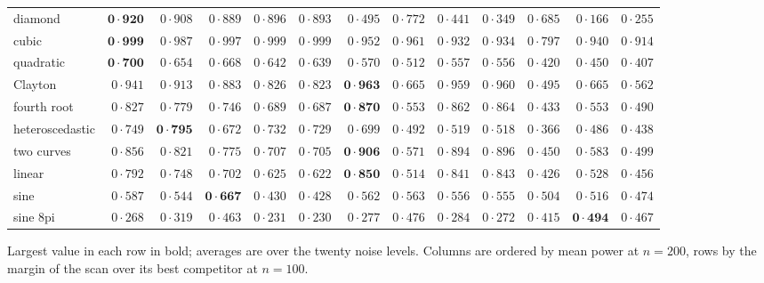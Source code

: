 \begin{table}
{\begin{tabular}{lrrrrrrrrrrrr}
diamond & $\mathbf{0{\cdot}920}$ & $0{\cdot}908$ & $0{\cdot}889$ & $0{\cdot}896$ & $0{\cdot}893$ & $0{\cdot}495$ & $0{\cdot}772$ & $0{\cdot}441$ & $0{\cdot}349$ & $0{\cdot}685$ & $0{\cdot}166$ & $0{\cdot}255$ \\
cubic & $\mathbf{0{\cdot}999}$ & $0{\cdot}987$ & $0{\cdot}997$ & $0{\cdot}999$ & $0{\cdot}999$ & $0{\cdot}952$ & $0{\cdot}961$ & $0{\cdot}932$ & $0{\cdot}934$ & $0{\cdot}797$ & $0{\cdot}940$ & $0{\cdot}914$ \\
quadratic & $\mathbf{0{\cdot}700}$ & $0{\cdot}654$ & $0{\cdot}668$ & $0{\cdot}642$ & $0{\cdot}639$ & $0{\cdot}570$ & $0{\cdot}512$ & $0{\cdot}557$ & $0{\cdot}556$ & $0{\cdot}420$ & $0{\cdot}450$ & $0{\cdot}407$ \\
Clayton & $0{\cdot}941$ & $0{\cdot}913$ & $0{\cdot}883$ & $0{\cdot}826$ & $0{\cdot}823$ & $\mathbf{0{\cdot}963}$ & $0{\cdot}665$ & $0{\cdot}959$ & $0{\cdot}960$ & $0{\cdot}495$ & $0{\cdot}665$ & $0{\cdot}562$ \\
fourth root & $0{\cdot}827$ & $0{\cdot}779$ & $0{\cdot}746$ & $0{\cdot}689$ & $0{\cdot}687$ & $\mathbf{0{\cdot}870}$ & $0{\cdot}553$ & $0{\cdot}862$ & $0{\cdot}864$ & $0{\cdot}433$ & $0{\cdot}553$ & $0{\cdot}490$ \\
heteroscedastic & $0{\cdot}749$ & $\mathbf{0{\cdot}795}$ & $0{\cdot}672$ & $0{\cdot}732$ & $0{\cdot}729$ & $0{\cdot}699$ & $0{\cdot}492$ & $0{\cdot}519$ & $0{\cdot}518$ & $0{\cdot}366$ & $0{\cdot}486$ & $0{\cdot}438$ \\
two curves & $0{\cdot}856$ & $0{\cdot}821$ & $0{\cdot}775$ & $0{\cdot}707$ & $0{\cdot}705$ & $\mathbf{0{\cdot}906}$ & $0{\cdot}571$ & $0{\cdot}894$ & $0{\cdot}896$ & $0{\cdot}450$ & $0{\cdot}583$ & $0{\cdot}499$ \\
linear & $0{\cdot}792$ & $0{\cdot}748$ & $0{\cdot}702$ & $0{\cdot}625$ & $0{\cdot}622$ & $\mathbf{0{\cdot}850}$ & $0{\cdot}514$ & $0{\cdot}841$ & $0{\cdot}843$ & $0{\cdot}426$ & $0{\cdot}528$ & $0{\cdot}456$ \\
sine & $0{\cdot}587$ & $0{\cdot}544$ & $\mathbf{0{\cdot}667}$ & $0{\cdot}430$ & $0{\cdot}428$ & $0{\cdot}562$ & $0{\cdot}563$ & $0{\cdot}556$ & $0{\cdot}555$ & $0{\cdot}504$ & $0{\cdot}516$ & $0{\cdot}474$ \\
sine 8pi & $0{\cdot}268$ & $0{\cdot}319$ & $0{\cdot}463$ & $0{\cdot}231$ & $0{\cdot}230$ & $0{\cdot}277$ & $0{\cdot}476$ & $0{\cdot}284$ & $0{\cdot}272$ & $0{\cdot}415$ & $\mathbf{0{\cdot}494}$ & $0{\cdot}467$ \\
\hline
\end{tabular}}
\begin{tabnote}
Largest value in each row in bold; averages are over the twenty noise levels. Columns are ordered by mean power at $n = 200$, rows by the margin of the scan over its best competitor at $n = 100$.
\end{tabnote}
\label{tab:power_by_scheme}
\end{table}

